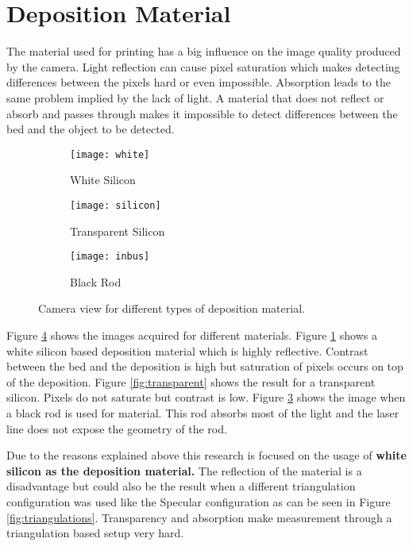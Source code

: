\section{Deposition Material}
The material used for printing has a big influence on the image quality produced by the camera. Light reflection can cause pixel saturation which makes detecting differences between the pixels hard or even impossible. Absorption leads to the same problem implied by the lack of light. A material that does not reflect or absorb and passes through makes it impossible to detect differences between the bed and the object to be detected. 
\begin{figure}[!ht]
\begin{subfigure}{0.32\textwidth}
\centering
\texttt{[image: white]} 
\caption{White Silicon}
\label{fig:white}
\end{subfigure}
\begin{subfigure}{0.33\textwidth}
\centering
\texttt{[image: silicon]}
\caption{Transparent Silicon}
\label{fig:transparant}
\end{subfigure}
\begin{subfigure}{0.33\textwidth}
\centering
\texttt{[image: inbus]}
\caption{Black Rod}
\label{fig:black}
\end{subfigure}
\caption{Camera view for different types of deposition material.}
\label{fig:material}
\end{figure}
\skippar
Figure \ref{fig:material} shows the images acquired for different materials. Figure \ref{fig:white} shows a white silicon based deposition material which is highly reflective. Contrast between the bed and the deposition is high but saturation of pixels occurs on top of the deposition. Figure \ref{fig:transparent} shows the result for a transparent silicon. Pixels do not saturate but contrast is low. Figure \ref{fig:black}  shows the image when a black rod is used for material. This rod absorbs most of the light and the laser line does not expose the geometry of the rod. 

Due to the reasons explained above this research is focused on the usage of \textbf{white silicon as the deposition material.} The reflection of the material is a disadvantage but could also be the result when a different triangulation configuration was used like the Specular configuration as can be seen in Figure \ref{fig:triangulations}. Transparency and absorption make measurement through a triangulation based setup very hard.
